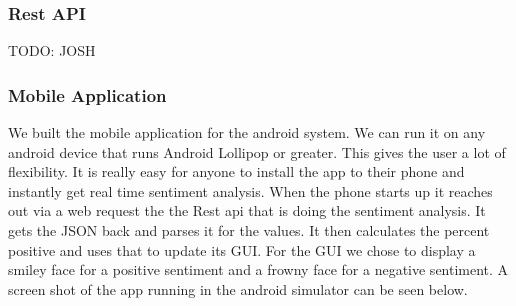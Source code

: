 \documentclass{acm_proc_article-sp}
\begin{document}
\subsubsection{Rest API}
TODO: JOSH

\subsubsection{Mobile Application}

We built the mobile application for the android system. We can run it on any
android device that runs Android Lollipop or greater. This gives the user a lot
of flexibility. It is really easy for anyone to install the app to their phone
and instantly get real time sentiment analysis. When the phone starts up it
reaches out via a web request the the Rest api that is doing the sentiment
analysis. It gets the JSON back and parses it for the values. It then
calculates the percent positive and uses that to update its GUI. For the GUI we
chose to display a smiley face for a positive sentiment and a frowny face for a
negative sentiment. A screen shot of the app running in the android simulator
can be seen below.  

\break
\end{document}
